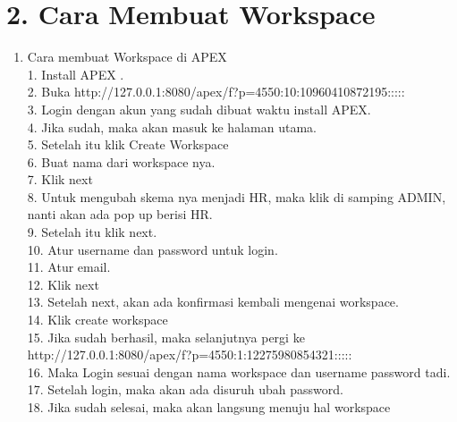 \section*{\normalsize 2. Cara Membuat Workspace}
\begin{enumerate}[label=\alph*.]
\item Cara membuat Workspace di APEX\\
1. Install APEX .\\
2. Buka http://127.0.0.1:8080/apex/f?p=4550:10:10960410872195:::::\\
3. Login dengan akun yang sudah dibuat waktu install APEX.\\
4. Jika sudah, maka akan masuk ke halaman utama.\\
5. Setelah itu klik Create Workspace\\
6. Buat nama dari workspace nya.\\
7. Klik next\\
8. Untuk mengubah skema nya menjadi HR, maka klik di samping ADMIN, nanti akan ada pop up berisi HR.\\
9. Setelah itu klik next.\\
10. Atur username dan password untuk login.\\
11. Atur email.\\
12. Klik next\\
13. Setelah next, akan ada konﬁrmasi kembali mengenai workspace.\\
14. Klik create workspace\\
15. Jika sudah berhasil, maka selanjutnya pergi ke http://127.0.0.1:8080/apex/f?p=4550:1:12275980854321:::::\\
16. Maka Login sesuai dengan nama workspace dan username password tadi.\\
17. Setelah login, maka akan ada disuruh ubah password.\\
18. Jika sudah selesai, maka akan langsung menuju hal workspace\\
\end{enumerate}

